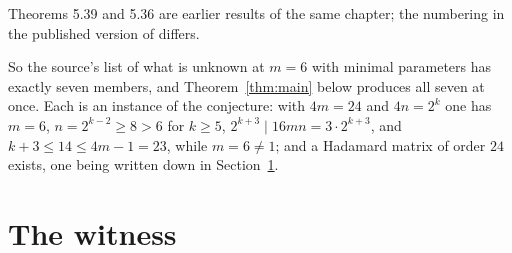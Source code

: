 \documentclass[11pt]{amsart}
\begin{document}
\noindent
Theorems 5.39 and 5.36 are earlier results of the same chapter; the numbering in the published
version of \cite{RC2023} differs.

So the source's list of what is unknown at $m=6$ with minimal parameters has exactly seven
members, and Theorem~\ref{thm:main} below produces all seven at once. Each is an instance of the
conjecture: with $4m=24$ and $4n=2^k$ one has $m=6$, $n=2^{k-2}\ge 8>6$ for $k\ge5$,
$2^{k+3}\mid 16mn=3\cdot 2^{k+3}$, and $k+3\le 14\le 4m-1=23$, while $m=6\ne1$; and a Hadamard
matrix of order $24$ exists, one being written down in Section~\ref{sec:witness}.

\section{The witness}\label{sec:witness}
\end{document}

